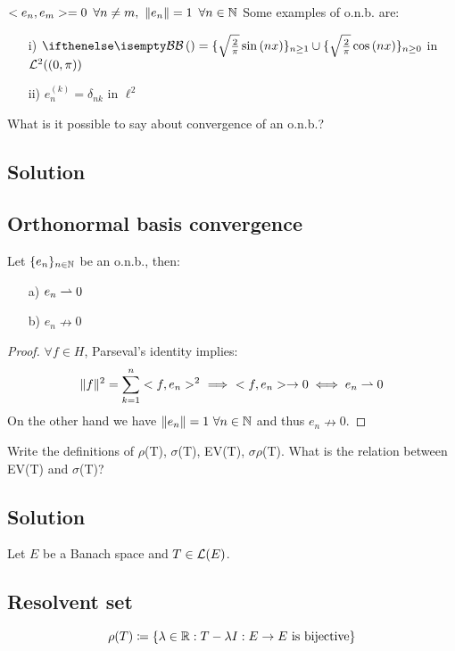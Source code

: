 $<e_n,e_m> = 0\,\,\,\forall n\neq m,\,\,\|e_n\|=1\,\,\, \forall n\in\mathbb{N}$
Some examples of o.n.b. are:
\begin{itemize}
    \item[i)] $\B = \{\sqrt{\tfrac{2}{\pi}}\sin{(nx)}\}_{n\ge 1} \cup \{\sqrt{\tfrac{2}{\pi}}\cos{(nx)}\}_{n\ge 0}$  in $\mathcal{L}^2((0,\pi))$
    \item[ii)] $e_n^{(k)} = \delta_{nk}$  in $\ell^2$
\\
\end{itemize}


\question
What is it possible to say about convergence of an o.n.b.?

\subsection*{Solution}

\subsection{Orthonormal basis convergence}
Let $\{e_n\}_{n\in\mathbb{N}}$ be an o.n.b., then:

\begin{itemize}
    \item[a)] $e_n \rightharpoonup 0$
    \item[b)] $e_n \nrightarrow 0$
\end{itemize}

\begin{proof}
    $\forall f \in H$, Parseval's identity implies:
    \[\|f\|^2 = \sum_{k=1}^n<f,e_n>^2 \,\,\implies\,\,<f,e_n>\to 0 \iff e_n \rightharpoonup 0
    \]
On the other hand we have $\|e_n\|=1\,\,\forall n\in\mathbb{N}$ and thus $e_n \nrightarrow 0$.
\end{proof}


\question
Write the definitions of $\rho$(T), $\sigma$(T), EV(T), $\sigma\rho$(T). What is the relation between EV(T) and $\sigma$(T)?
    
\subsection*{Solution}

Let $E$ be a Banach space and $T\in \mathcal{L}(E)$.

\subsection{Resolvent set}
\[\rho(T)\coloneqq\{\lambda\in\mathbb{R}:T-\lambda I: E\to E \mbox{ is bijective}\}\]

